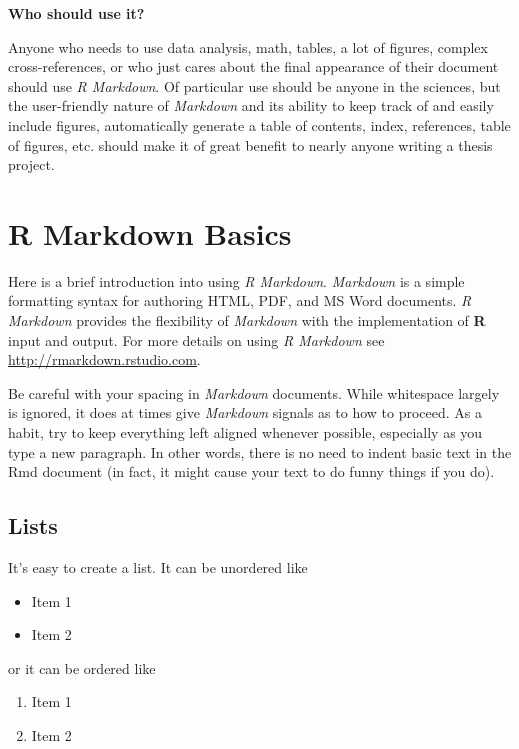 \documentclass[print]{nuthesis}
\providecommand{\tightlist}{%
  \setlength{\itemsep}{0pt}\setlength{\parskip}{0pt}}
\begin{document}
\textbf{Who should use it?}

Anyone who needs to use data analysis, math, tables, a lot of figures, complex cross-references, or who just cares about the final appearance of their document should use \emph{R Markdown}. Of particular use should be anyone in the sciences, but the user-friendly nature of \emph{Markdown} and its ability to keep track of and easily include figures, automatically generate a table of contents, index, references, table of figures, etc. should make it of great benefit to nearly anyone writing a thesis project.

\hypertarget{rmd-basics}{%
\chapter{R Markdown Basics}\label{rmd-basics}}

Here is a brief introduction into using \emph{R Markdown}. \emph{Markdown} is a simple formatting syntax for authoring HTML, PDF, and MS Word documents. \emph{R Markdown} provides the flexibility of \emph{Markdown} with the implementation of \textbf{R} input and output. For more details on using \emph{R Markdown} see \url{http://rmarkdown.rstudio.com}.

Be careful with your spacing in \emph{Markdown} documents. While whitespace largely is ignored, it does at times give \emph{Markdown} signals as to how to proceed. As a habit, try to keep everything left aligned whenever possible, especially as you type a new paragraph. In other words, there is no need to indent basic text in the Rmd document (in fact, it might cause your text to do funny things if you do).

\hypertarget{lists}{%
\section{Lists}\label{lists}}

It's easy to create a list. It can be unordered like

\begin{itemize}
\tightlist
\item
  Item 1
\item
  Item 2
\end{itemize}

or it can be ordered like

\begin{enumerate}
\def\labelenumi{\arabic{enumi}.}
\tightlist
\item
  Item 1
\item
  Item 2
\end{enumerate}
\end{document}
